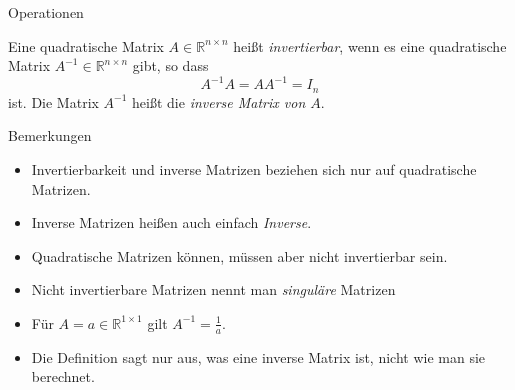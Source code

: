 \documentclass[
  8pt,
  ignorenonframetext,
]{beamer}
\providecommand{\tightlist}{%
  \setlength{\itemsep}{0pt}\setlength{\parskip}{0pt}}
\begin{document}
\begin{frame}{Operationen}
\protect\hypertarget{operationen-23}{}
\small
\begin{definition}
\justifying
Eine quadratische Matrix $A \in \mathbb{R}^{n \times n}$ heißt \textit{invertierbar}, wenn es eine
quadratische Matrix $A^{-1} \in \mathbb{R}^{n \times n}$ gibt, so dass
\begin{equation}
A^{-1}A = AA^{-1} = I_n
\end{equation}
ist. Die Matrix $A^{-1}$ heißt die \textit{inverse Matrix von $A$}.
\end{definition}

\footnotesize

Bemerkungen

\begin{itemize}
\tightlist
\item
  Invertierbarkeit und inverse Matrizen beziehen sich nur auf
  quadratische Matrizen.
\item
  Inverse Matrizen heißen auch einfach \emph{Inverse}.
\item
  Quadratische Matrizen können, müssen aber nicht invertierbar sein.
\item
  Nicht invertierbare Matrizen nennt man \emph{singuläre} Matrizen
\item
  Für \(A = a \in \mathbb{R}^{1 \times 1}\) gilt
  \(A^{-1} = \frac{1}{a}\).
\item
  Die Definition sagt nur aus, was eine inverse Matrix ist, nicht wie
  man sie berechnet.
\end{itemize}
\end{frame}
\end{document}
